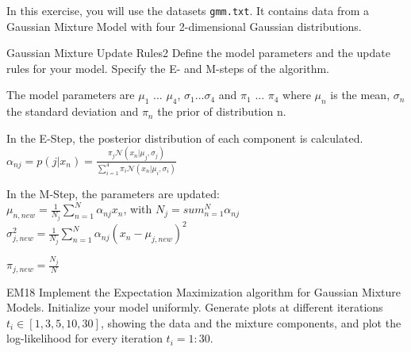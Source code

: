 \newif\ifvimbug
\vimbugfalse

\ifvimbug

\fi

 
In this exercise, you will use the datasets \texttt{gmm.txt}. It contains data from a Gaussian Mixture Model with four 2-dimensional Gaussian distributions.

\begin{questions}


\begin{question}{Gaussian Mixture Update Rules}{2}
Define the model parameters and the update rules for your model. 
Specify the E- and M-steps of the algorithm.

\begin{answer}
	The model parameters are $\mu_1$ ... $\mu_4$, $\sigma_1$...$\sigma_4$ and $\pi_1$ ... $\pi_4$ where $\mu_n$ is the mean, $\sigma_n$ the standard deviation and $\pi_n$ the prior of distribution n.
	
	In the E-Step, the posterior distribution of each component is calculated.\\
	$\alpha_{nj} = p(j|x_n) = \frac{\pi_j \mathcal{N}(x_n|\mu_j,\sigma_j)}{\sum_{i=1}^{4}\pi_i \mathcal{N}(x_n | \mu_i, \sigma_i)}$
	
	In the M-Step, the parameters are updated:\\
	$\mu_{n,new} = \frac{1}{N_j} \sum_{n=1}^{N} \alpha_{nj}x_n$, with $N_j = sum_{n=1}^{N} \alpha_{nj}$\\
	$\sigma_{j,new}^2 = \frac{1}{N_j} \sum_{n=1}^{N} \alpha_{nj}(x_n-\mu_{j,new})^2$
	
	$\pi_{j,new} = \frac{N_j}{N}$
	
\end{answer}

\end{question}


\begin{question}{EM}{18}
Implement the Expectation Maximization algorithm for Gaussian Mixture Models. Initialize your model uniformly. Generate plots at different iterations $t_i \in [1,3,5,10,30]$, showing the data and the mixture components, and plot the log-likelihood for every iteration $t_i=1:30$.

\begin{answer}
\end{answer}

\end{question}

\end{questions}
